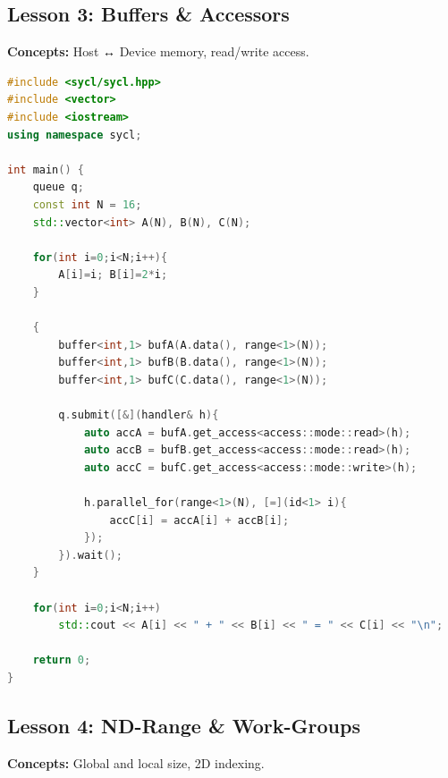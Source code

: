 \documentclass[a4paper,12pt]{article}
\begin{document}
\subsection{Lesson 3: Buffers \& Accessors}
\textbf{Concepts:} Host ↔ Device memory, read/write access.

\begin{lstlisting}[language=C++]
#include <sycl/sycl.hpp>
#include <vector>
#include <iostream>
using namespace sycl;

int main() {
    queue q;
    const int N = 16;
    std::vector<int> A(N), B(N), C(N);

    for(int i=0;i<N;i++){
        A[i]=i; B[i]=2*i;
    }

    {
        buffer<int,1> bufA(A.data(), range<1>(N));
        buffer<int,1> bufB(B.data(), range<1>(N));
        buffer<int,1> bufC(C.data(), range<1>(N));

        q.submit([&](handler& h){
            auto accA = bufA.get_access<access::mode::read>(h);
            auto accB = bufB.get_access<access::mode::read>(h);
            auto accC = bufC.get_access<access::mode::write>(h);

            h.parallel_for(range<1>(N), [=](id<1> i){
                accC[i] = accA[i] + accB[i];
            });
        }).wait();
    }

    for(int i=0;i<N;i++)
        std::cout << A[i] << " + " << B[i] << " = " << C[i] << "\n";

    return 0;
}
\end{lstlisting}

\subsection{Lesson 4: ND-Range \& Work-Groups}
\textbf{Concepts:} Global and local size, 2D indexing.
\end{document}
